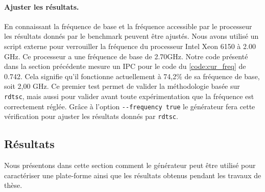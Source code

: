         \paragraph{Ajuster les résultats.} En connaissant la fréquence de base et la fréquence accessible par le processeur les résultats donnés par le benchmark peuvent être ajustés. Nous avons utilisé un script externe pour verrouiller la fréquence du processeur Intel Xeon 6150 à 2.00 GHz. Ce processeur a une fréquence de base de 2.70GHz. Notre code présenté dans la section précédente mesure un IPC pour le code du \autoref{code:cur_freq} de 0.742. Cela signifie qu'il fonctionne actuellement à 74,2\% de sa fréquence de base, soit 2,00 GHz. Ce premier test permet de valider la méthodologie basée sur \verb|rdtsc|, mais aussi pour valider avant toute expérimentation que la fréquence est correctement réglée. Grâce à l'option \verb|--frequency true| le générateur fera cette vérification pour ajuster les résultats donnés par \verb|rdtsc|. 
        
    
    
    
    
    
    
\subsection{Résultats}
    Nous présentons dans cette section comment le générateur peut être utilisé pour caractériser une plate-forme ainsi que les résultats obtenus pendant les travaux de thèse.
   
   
   

